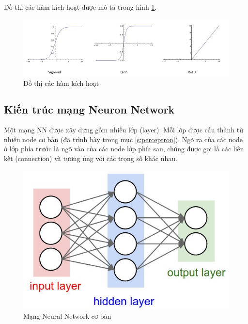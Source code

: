 \noindent Đồ thị các hàm kích hoạt được mô tả trong hình \ref{fig:activation_function}.

\FloatBarrier
\begin{figure}[htp]
\begin{center}
\includegraphics[scale=0.8]{chap2/c2_figs/activation_function.PNG}
\end{center}
\caption{Đồ thị các hàm kích hoạt}
\label{fig:activation_function}
\end{figure}
\FloatBarrier


\subsection{Kiến trúc mạng Neuron Network}

Một mạng NN được xây dựng gồm nhiều lớp (layer). Mỗi lớp được cấu thành từ nhiều node cơ bản (đã trình bày trong mục \ref{s:perceptron}). Ngõ ra của các node ở lớp phía trước là ngõ vào của các node lớp phía sau, chúng được gọi là các liên kết (connection) và tương ứng với các trọng số khác nhau.

\FloatBarrier
\begin{figure}[htp]
\begin{center}
\includegraphics[scale=0.8]{chap2/c2_figs/structure_NN.PNG}
\end{center}
\caption{Mạng Neural Network cơ bản}
\label{fig:structure_NN}
\end{figure}
\FloatBarrier

